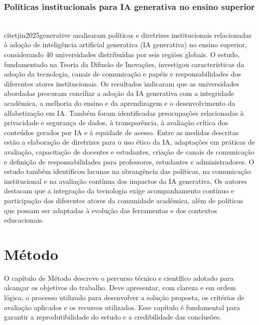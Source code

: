 \documentclass{eic-bcc-tcc}
\begin{document}
\subsection{Políticas institucionais para IA generativa no ensino superior}

\\citet{jin2025generative} analisaram políticas e diretrizes institucionais relacionadas à adoção de inteligência artificial generativa (IA generativa) no ensino superior, considerando 40 universidades distribuídas por seis regiões globais. O estudo, fundamentado na Teoria da Difusão de Inovações, investigou características da adoção da tecnologia, canais de comunicação e papéis e responsabilidades dos diferentes atores institucionais. Os resultados indicaram que as universidades abordadas procuram conciliar a adoção da IA generativa com a integridade acadêmica, a melhoria do ensino e da aprendizagem e o desenvolvimento da alfabetização em IA. Também foram identificadas preocupações relacionadas à privacidade e segurança de dados, à transparência, à avaliação crítica dos conteúdos gerados por IA e à equidade de acesso. Entre as medidas descritas estão a elaboração de diretrizes para o uso ético da IA, adaptações em práticas de avaliação, capacitação de docentes e estudantes, criação de canais de comunicação e definição de responsabilidades para professores, estudantes e administradores. O estudo também identificou lacunas na abrangência das políticas, na comunicação institucional e na avaliação contínua dos impactos da IA generativa. Os autores destacam que a integração da tecnologia exige acompanhamento contínuo e participação dos diferentes atores da comunidade acadêmica, além de políticas que possam ser adaptadas à evolução das ferramentas e dos contextos educacionais.



\chapter{Método}
\label{cha:metodo}

O capítulo de Método descreve o percurso técnico e científico adotado para alcançar os objetivos do trabalho. Deve apresentar, com clareza e em ordem lógica, o processo utilizado para desenvolver a solução proposta, os critérios de avaliação aplicados e os recursos utilizados. Esse capítulo é fundamental para garantir a reprodutibilidade do estudo e a credibilidade das conclusões.
\end{document}
